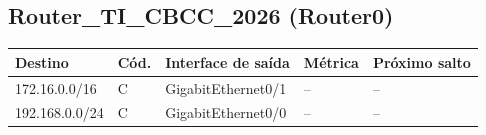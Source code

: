 \subsection*{Router\_TI\_CBCC\_2026 (Router0)}
\begin{tabular}{@{}llllp{3.6cm}@{}}\toprule Destino & Cód. & Interface de saída & Métrica & Próximo salto\\\midrule
172.16.0.0/16 & C & GigabitEthernet0/1 & -- & --\\
192.168.0.0/24 & C & GigabitEthernet0/0 & -- & --\\
\bottomrule\end{tabular}
